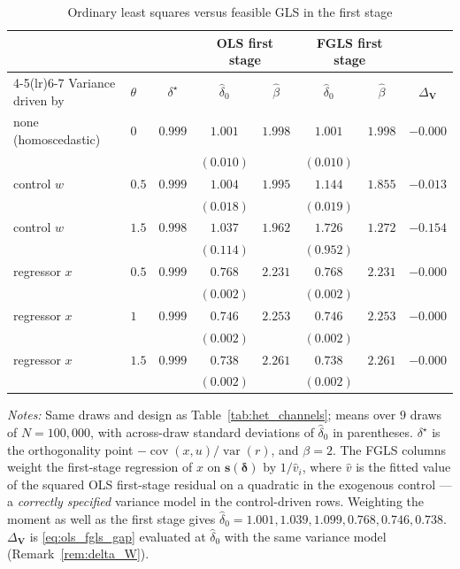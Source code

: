\begin{table}[!h]
\centering
\caption{Ordinary least squares versus feasible GLS in the first stage}
\label{tab:fgls}
\begin{threeparttable}
\begin{tabular}{llcccccc}
\toprule
& & & \multicolumn{2}{c}{OLS first stage}
& \multicolumn{2}{c}{FGLS first stage} & \\
\cmidrule(lr){4-5}\cmidrule(lr){6-7}
Variance driven by & \(\theta\) & \(\delta^\star\)
& \(\widehat\delta_0\) & \(\widehat\beta\)
& \(\widehat\delta_0\) & \(\widehat\beta\)
& \(\Delta_{\mathbf V}\) \\
\midrule
none (homoscedastic) & \(0\) & \(0.999\) & \(1.001\) & \(1.998\) & \(1.001\) & \(1.998\) & \(-0.000\) \\
 & & & \((0.010)\) & & \((0.010)\) & & \\
\midrule
control \(w\) & \(0.5\) & \(0.999\) & \(1.004\) & \(1.995\) & \(1.144\) & \(1.855\) & \(-0.013\) \\
 & & & \((0.018)\) & & \((0.019)\) & & \\
control \(w\) & \(1.5\) & \(0.998\) & \(1.037\) & \(1.962\) & \(1.726\) & \(1.272\) & \(-0.154\) \\
 & & & \((0.114)\) & & \((0.952)\) & & \\
\midrule
regressor \(x\) & \(0.5\) & \(0.999\) & \(0.768\) & \(2.231\) & \(0.768\) & \(2.231\) & \(-0.000\) \\
 & & & \((0.002)\) & & \((0.002)\) & & \\
regressor \(x\) & \(1\) & \(0.999\) & \(0.746\) & \(2.253\) & \(0.746\) & \(2.253\) & \(-0.000\) \\
 & & & \((0.002)\) & & \((0.002)\) & & \\
regressor \(x\) & \(1.5\) & \(0.999\) & \(0.738\) & \(2.261\) & \(0.738\) & \(2.261\) & \(-0.000\) \\
 & & & \((0.002)\) & & \((0.002)\) & & \\
\bottomrule
\end{tabular}
\begin{tablenotes}
\small
\item \textit{Notes:} Same draws and design as Table~\ref{tab:het_channels};
means over \(9\) draws of \(N=100{,}000\), with across-draw standard deviations of
\(\widehat\delta_0\) in parentheses. \(\delta^\star\) is the orthogonality point
\(-\operatorname{cov}(x,u)/\operatorname{var}(r)\), and \(\beta=2\). The FGLS
columns weight the first-stage regression of \(x\) on \(\mathbf s(\boldsymbol\delta)\)
by \(1/\widehat v_i\), where \(\widehat v\) is the fitted value of the squared OLS
first-stage residual on a quadratic in the exogenous control --- a
\emph{correctly specified} variance model in the control-driven rows. Weighting
the moment as well as the first stage gives \(\widehat\delta_0=1.001, 1.039, 1.099, 0.768, 0.746, 0.738\).
\(\Delta_{\mathbf V}\) is \eqref{eq:ols_fgls_gap} evaluated at
\(\widehat\delta_0\) with the same variance model (Remark~\ref{rem:delta_W}).
\end{tablenotes}
\end{threeparttable}
\end{table}
